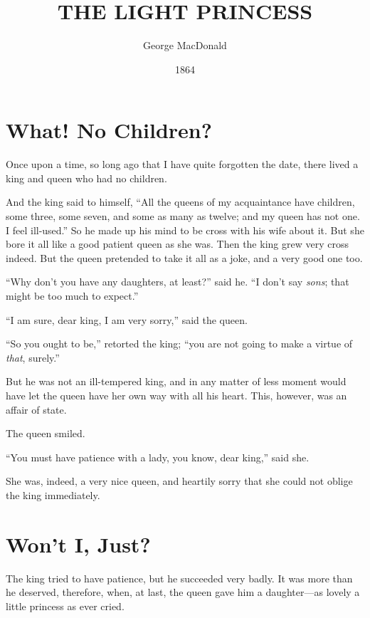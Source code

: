 \documentclass[12pt]{memoir}
\title{THE LIGHT PRINCESS}
\author{George MacDonald}
\date{1864}
\begin{document}
\frontmatter

\maketitle

\mainmatter

\chapter{What! No Children?}

Once upon a time, so long ago that I have quite forgotten the date,
there lived a king and queen who had no children.

And the king said to himself, ``All the queens of my acquaintance have
children, some three, some seven, and some as many as twelve; and my
queen has not one.  I feel ill-used.''  So he made up his mind to be
cross with his wife about it.  But she bore it all like a good patient
queen as she was.  Then the king grew very cross indeed.  But the
queen pretended to take it all as a joke, and a very good one too.

``Why don't you have any daughters, at least?'' said he.  ``I don't
say \emph{sons}; that might be too much to expect.''

``I am sure, dear king, I am very sorry,'' said the queen.

``So you ought to be,'' retorted the king; ``you are not going to make
a virtue of \emph{that}, surely.''

But he was not an ill-tempered king, and in any matter of less moment
would have let the queen have her own way with all his heart.  This,
however, was an affair of state.

The queen smiled.

``You must have patience with a lady, you know, dear king,'' said she.

She was, indeed, a very nice queen, and heartily sorry that she could
not oblige the king immediately.



\chapter{Won't I, Just?}


The king tried to have patience, but he succeeded very badly.  It was
more than he deserved, therefore, when, at last, the queen gave him a
daughter---as lovely a little princess as ever cried.
\end{document}
